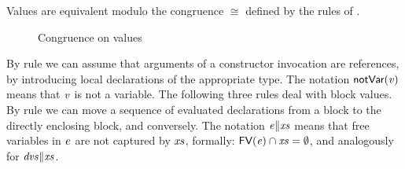 Values are equivalent modulo the congruence $\cong$ defined by the rules of . 
\begin{figure}[ht]
\framebox{
\begin{small}
\begin{math}
\begin{array}{l}
\NamedRuleOL{new}
{
\begin{array}{l}
{\ConstrCall{\C}{
  \val_1,.., \val_{i-1},\val_i,\val_{i+1},..,\val_n}}\\
  \cong{\Block{\Dec{\T_i}{\x}{{\val_i}}}{\ConstrCall{\C}{\val_1,.., \val_{i-1},\x,\val_{i+1},..,\val_n}}}
\end{array}
}
{\begin{array}{l}
\fields{\C}{=}\Field{\T_1}{\f_1}..\Field{\T_n}{\f_n}\\
\notRef{\val_i}\\
\x\not\in\FV{\val_j}\ \ (1\leq j\leq n)
\end{array}}
\\[3ex]
\NamedRuleOL{body}{\congruence{\Block{\dvs}{\Block{\dvs'\ \dvs''}{\val}}}{\Block{\dvs\ \dvs'}{\Block{\dvs''}{\val}}}}
{\begin{array}{l}
{\noCapture{\dvs}{\dom{\dvs'}}}\\
{\noCapture{\dvs'}{\dom{\dvs''}}}
\end{array}
}
\\[3ex]
{\NamedRuleOL{garbage}{\congruence{\Block{\dvs\ \dvs' }{\val}}{\Block{\dvs'}{{\val}}}}
{\noCapture{\Block{\dvs'}{\val}}{\dom{\dvs}}}}
\\[3ex]
\NamedRuleOL{block-elim}{\congruence{\Block{}{{\val}}}{\val}}{}
\end{array}
\end{math}
\end{small}
}
\caption{Congruence on values}
\label{fig:congruenceVal}
\end{figure}
By rule  we can assume that arguments of a constructor invocation are references, by introducing local declarations of the appropriate type. The notation ${\textsf{notVar}}(\mathit{v})$ means that $\mathit{v}$ is not a variable. 
The following three rules deal with block values.
By rule  we can move a sequence of evaluated declarations
from a block to the directly enclosing block, and conversely. The notation $\mathit{e}{\parallel}\mathit{xs}$ means that free variables in $\mathit{e}$ are not captured by $\mathit{xs}$, formally: $\textsf{FV}(\mathit{e})\cap\mathit{xs}=\emptyset$, and analogously for $\mathit{dvs}{\parallel}\mathit{xs}$. 
